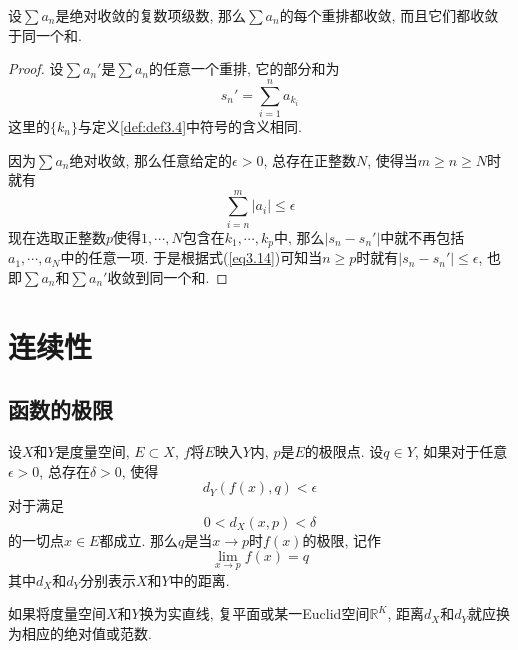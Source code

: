 \documentclass[cn,12pt,math=mtpro2,citestyle=gb7714-2015,bibstyle=gb7714-2015,twocol]{elegantbook}
\newcommand{\R}{\mathbb{R}}
\begin{document}
\begin{theorem}
  设$\sum a_n$是绝对收敛的复数项级数, 那么$\sum a_n$的每个重排都收敛, 而且它们都收敛于同一个和.
\end{theorem}
\begin{proof}
  设$\sum a_n'$是$\sum a_n$的任意一个重排, 它的部分和为
  $$s_n'=\sum_{i=1}^{n}a_{k_i}$$
  这里的$\{k_n\}$与定义\ref{def:def3.4}中符号的含义相同.

  因为$\sum a_n$绝对收敛, 那么任意给定的$\epsilon>0$, 总存在正整数$N$, 使得当$m\geq n\geq N$时就有
  \begin{equation}\label{eq3.14}
    \sum_{i=n}^{m}|a_i|\leq\epsilon
  \end{equation}
  现在选取正整数$p$使得$1,\cdots,N$包含在$k_1,\cdots,k_p$中, 那么$|s_n-s_n'|$中就不再包括$a_1,\cdots,a_N$中的任意一项. 于是根据式(\ref{eq3.14})可知当$n\geq p$时就有$|s_n-s_n'|\leq\epsilon$, 也即$\sum a_n$和$\sum a_n'$收敛到同一个和.


\end{proof}
\chapter{连续性}
\section{函数的极限}
\begin{definition}\label{def:def4.1}
设$X$和$Y$是度量空间, $E\subset X$, $f$将$E$映入$Y$内, $p$是$E$的极限点. 设$q\in Y$, 如果对于任意$\epsilon>0$, 总存在$\delta>0$, 使得
$$d_Y(f(x),q)<\epsilon$$
对于满足
$$0<d_X(x,p)<\delta$$
的一切点$x\in E$都成立. 那么$q$是当$x\rightarrow p$时$f(x)$的极限, 记作
$$\lim_{x\to p}f(x)=q$$
其中$d_X$和$d_Y$分别表示$X$和$Y$中的距离.
\end{definition}
如果将度量空间$X$和$Y$换为实直线, 复平面或某一Euclid空间$\R^K$, 距离$d_X$和$d_Y$就应换为相应的绝对值或范数.
\end{document}
